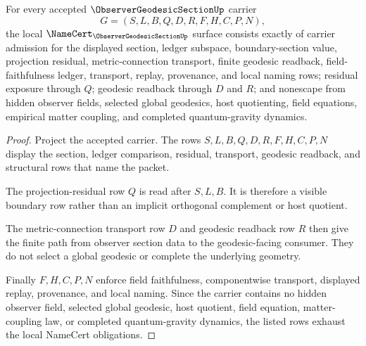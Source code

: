 \begin{theorem}
\label{thm:observer-geodesic-section-namecert-obligations}
For every accepted $\ObserverGeodesicSectionUp$ carrier
$$
G=(S,L,B,Q,D,R,F,H,C,P,N),
$$
the local $\NameCert_{\ObserverGeodesicSectionUp}$ surface consists exactly of carrier admission for the displayed section, ledger subspace, boundary-section value, projection residual, metric-connection transport, finite geodesic readback, field-faithfulness ledger, transport, replay, provenance, and local naming rows; residual exposure through $Q$; geodesic readback through $D$ and $R$; and nonescape from hidden observer fields, selected global geodesics, host quotienting, field equations, empirical matter coupling, and completed quantum-gravity dynamics.
\end{theorem}
\begin{proof}
Project the accepted carrier. The rows $S,L,B,Q,D,R,F,H,C,P,N$ display the section, ledger comparison, residual, transport, geodesic readback, and structural rows that name the packet.

The projection-residual row $Q$ is read after $S,L,B$. It is therefore a visible boundary row rather than an implicit orthogonal complement or host quotient.

The metric-connection transport row $D$ and geodesic readback row $R$ then give the finite path from observer section data to the geodesic-facing consumer. They do not select a global geodesic or complete the underlying geometry.

Finally $F,H,C,P,N$ enforce field faithfulness, componentwise transport, displayed replay, provenance, and local naming. Since the carrier contains no hidden observer field, selected global geodesic, host quotient, field equation, matter-coupling law, or completed quantum-gravity dynamics, the listed rows exhaust the local NameCert obligations.
\end{proof}

